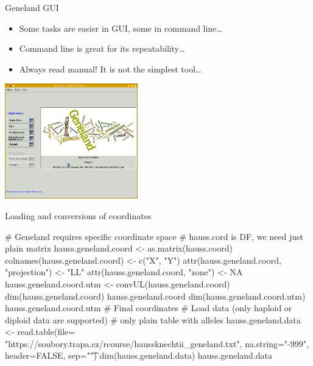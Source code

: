 \documentclass[compress, ucs, xelatex, 11pt, xcolor=svgnames,
  hyperref={
    bookmarks=true,
    unicode=true,
    colorlinks=true,
    pdftitle={Molecular data in R},
    plainpages=false,
    pdfauthor={Vojtech Zeisek},
    pdfsubject={Course about phylogeny and evolution in R},
    pdfcreator={XeLaTeX},
    pdfkeywords={R, evolution, phylogeny, molecular data},
    linkcolor=Tomato,
    anchorcolor=SaddleBrown,
    citecolor=Goldenrod,
    filecolor=DarkMagenta,
    menucolor=Sienna,
    urlcolor=DarkTurquoise,
    pdftex},
  url={hyphens, lowtilde} %
  ]{beamer}
\begin{document}
\begin{frame}{Geneland GUI}
  \begin{itemize}
    \item Some tasks are easier in GUI, some in command line\ldots
    \item Command line is great for its repeatability\ldots
    \item Always read manual! It is not the simplest tool\ldots
  \end{itemize}
  \begin{center}
    \includegraphics[height=5cm]{geneland_gui.png}
  \end{center}
\end{frame}

\begin{frame}[fragile]{Loading and conversions of coordinates}
  \begin{spluscode}
    # Geneland requires specific coordinate space
    # hauss.cord is DF, we need just plain matrix
    hauss.geneland.coord <- as.matrix(hauss.coord)
    colnames(hauss.geneland.coord) <- c("X", "Y")
    attr(hauss.geneland.coord, "projection") <- "LL"
    attr(hauss.geneland.coord, "zone") <- NA
    hauss.geneland.coord.utm <- convUL(hauss.geneland.coord)
    dim(hauss.geneland.coord)
    hauss.geneland.coord
    dim(hauss.geneland.coord.utm)
    hauss.geneland.coord.utm # Final coordinates
    # Load data (only haploid or diploid data are supported)
    # only plain table with alleles
    hauss.geneland.data <- read.table(file=
      "https://soubory.trapa.cz/rcourse/haussknechtii_geneland.txt",
      na.string="-999", header=FALSE, sep="\t")
    dim(hauss.geneland.data)
    hauss.geneland.data
  \end{spluscode}
\end{frame}
\end{document}

